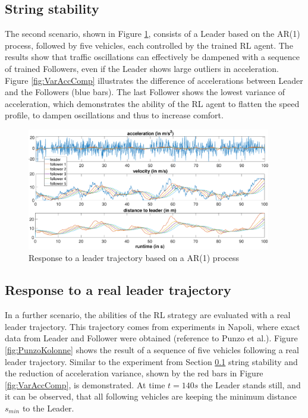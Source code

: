 \documentclass[review]{elsarticle}
\begin{document}
\subsection{String stability}
\label{sec:stringStability}
The second scenario, shown in Figure \ref{fig:AR1Kolonne}, consists of a Leader based on the AR(1) process, followed by five vehicles, each controlled by the trained RL agent. The results show that traffic oscillations can effectively be dampened with a sequence of trained Followers, even if the Leader shows large outliers in acceleration. Figure \ref{fig:VarAccComp} illustrates the difference of accelerations between Leader and the Followers (blue bars). The last Follower shows the lowest variance of acceleration, which demonstrates the ability of the RL agent to flatten the speed profile, to dampen oscillations and thus to increase comfort.  


\begin{figure}
	\centering
	\includegraphics[width=0.95\textwidth]{images/AR1Kolonne}
	\caption{Response to a leader trajectory based on a AR(1) process}
	\label{fig:AR1Kolonne}
\end{figure}


\subsection{Response to a real leader trajectory}

In a further scenario, the abilities of the RL strategy are evaluated with a real leader trajectory. This trajectory comes from experiments in Napoli, where exact data from Leader and Follower were obtained (reference to Punzo et al.). Figure \ref{fig:PunzoKolonne} shows the result of a sequence of five vehicles following a real leader trajectory. Similar to the experiment from Section \ref{sec:stringStability} string stability and the reduction of acceleration variance, shown by the red bars in Figure \ref{fig:VarAccComp}, is demonstrated. At time $t = 140s$ the Leader stands still, and it can be observed, that all following vehicles are keeping the minimum distance $s_{min}$ to the Leader. 
\end{document}
